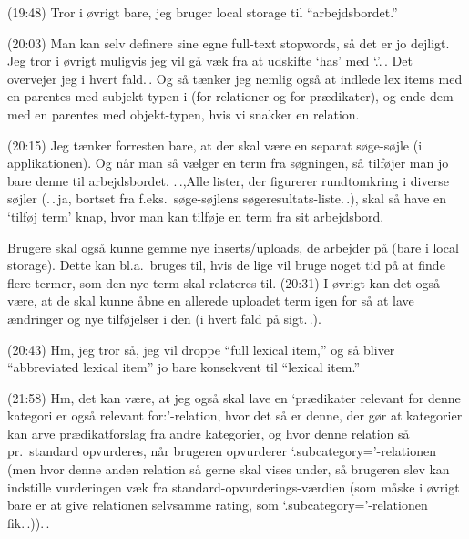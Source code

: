 \documentclass{report}
\begin{document}
(19:48) Tror i øvrigt bare, jeg bruger local storage til ``arbejdsbordet.'' 

(20:03) Man kan selv definere sine egne full-text stopwords, så det er jo dejligt. Jeg tror i øvrigt muligvis jeg vil gå væk fra at udskifte `has' med `.'.\,. Det overvejer jeg i hvert fald.\,. Og så tænker jeg nemlig også at indlede lex items med en parentes med subjekt-typen i (for relationer og for prædikater), og ende dem med en parentes med objekt-typen, hvis vi snakker en relation.

(20:15) Jeg tænker forresten bare, at der skal være en separat søge-søjle (i applikationen). Og når man så vælger en term fra søgningen, så tilføjer man jo bare denne til arbejdsbordet. .\,.,Alle lister, der figurerer rundtomkring i diverse søjler (.\,.\,ja, bortset fra f.eks.\ søge-søjlens søgeresultats-liste.\,.), skal så have en `tilføj term' knap, hvor man kan tilføje en term fra sit arbejdsbord.

Brugere skal også kunne gemme nye inserts/uploads, de arbejder på (bare i local storage). Dette kan bl.a.\ bruges til, hvis de lige vil bruge noget tid på at finde flere termer, som den nye term skal relateres til. (20:31) I øvrigt kan det også være, at de skal kunne åbne en allerede uploadet term igen for så at lave ændringer og nye tilføjelser i den (i hvert fald på sigt.\,.). 

(20:43) Hm, jeg tror så, jeg vil droppe ``full lexical item,'' og så bliver ``abbreviated lexical item'' jo bare konsekvent til ``lexical item.'' 

(21:58) Hm, det kan være, at jeg også skal lave en `prædikater relevant for denne kategori er også relevant for:'-relation, hvor det så er denne, der gør at kategorier kan arve prædikatforslag fra andre kategorier, og hvor denne relation så pr.\ standard opvurderes, når brugeren opvurderer `.subcategory='-relationen (men hvor denne anden relation så gerne skal vises under, så brugeren slev kan indstille vurderingen væk fra standard-opvurderings-værdien (som måske i øvrigt bare er at give relationen selvsamme rating, som `.subcategory='-relationen fik.\,.)).\,. 
\end{document}
